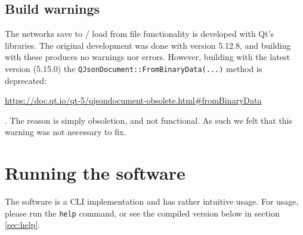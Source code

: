 \subsection{Build warnings}
The networks save to / load from file functionality is developed with Qt's libraries. The original development was done with version 5.12.8, and building with these produces no warnings nor errors. However, building with the latest version (5.15.0) the \texttt{QJsonDocument::FromBinaryData(...)} method is deprecated: \begin{footnotesize}{\url{https://doc.qt.io/qt-5/qjsondocument-obsolete.html#fromBinaryData}}\end{footnotesize}. The reason is simply obsoletion, and not functional. As such we felt that this warning was not necessary to fix.

\section{Running the software}
The software is a CLI implementation and has rather intuitive usage. For usage, please run the \texttt{help} command, or see the compiled version below in section \ref{sec:help}.

